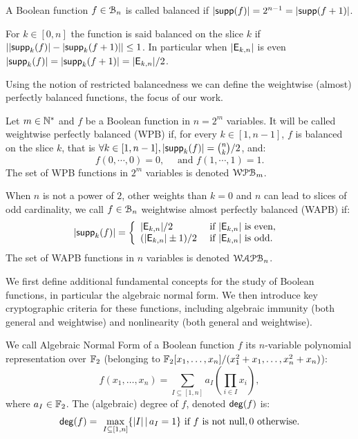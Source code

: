 \documentclass[11pt]{llncs}
\begin{document}
\begin{definition}[Balancedness]\label{def:balancedness}
	A Boolean function $f\in \mathcal{B}_n$ is called balanced if $|\mathsf{supp}(f)|=2^{n-1}=|\mathsf{supp}(f+1)|$. 
	
	For $k\in [0,n]$ the function is said balanced on the slice $k$ if $||\mathsf{supp}_{k}(f)|-|\mathsf{supp}_{k}(f+1)| |\le 1$. In particular when $|\mathsf{E}_{k,n}|$ is even $|\mathsf{supp}_{k}(f)|=|\mathsf{supp}_{k}(f+1)|=|\mathsf{E}_{k,n}|/2$.
\end{definition}

Using the notion of restricted balancedness we can define the weightwise (almost) perfectly balanced functions, the focus of our work.

\begin{definition}\label{def:WAPB}
	Let $m\in \mathbb{N}^*$ and $f$ be a Boolean function in $n=2^m$ variables. It will be called weightwise perfectly balanced (WPB) if, for every $k\in[1,n-1]$, $f$ is balanced on the slice $k$, that is $\forall k \in [1,n-1], |\mathsf{supp}_{k}(f)|=\binom{n}{k}/2$, and:
	\[f(0,\cdots,0)=0,\quad \text{ and } f(1,\cdots,1)=1.\]	
	The set of WPB functions in $2^m$ variables is denoted $\mathcal{WPB}_{m}$.
	
	When $n$ is not a power of $2$, other weights than $k=0$ and $n$ can lead to slices of odd cardinality, we call $f\in \mathcal{B}_{n}$ weightwise almost perfectly balanced (WAPB) if: 
	\[|\mathsf{supp}_{k}(f)|= \left \{
	\begin{array}{l l}
	|\mathsf{E}_{k,n}|/2  & \text{ if } |\mathsf{E}_{k,n}| \text{ is even, } \\
	(|\mathsf{E}_{k,n}|\pm 1)/2  & \text{ if }  |\mathsf{E}_{k,n}| \text{ is odd.}
	\end{array}\right.\]
	The set of WAPB functions in $n$ variables is denoted $\mathcal{WAPB}_{n}$.		
\end{definition}

We first define additional fundamental concepts for the study of Boolean functions, in particular the algebraic normal form. We then introduce key cryptographic criteria for these functions, including algebraic immunity (both general and weightwise) and nonlinearity (both general and weightwise).

\begin{definition}\label{def:anf}
We call Algebraic Normal Form of a Boolean function $f$ its $n$-variable polynomial representation over $\mathbb{F}_2$ (\ie belonging to $\mathbb{F}_2[x_1,\dots,x_n]/(x_1^2+x_1,\dots,x_n^2+x_n)$):
	\[f(x_1,\dots,x_n)= \sum_{I \subseteq [1,n]} a_I \left( \prod_{i \in I} x_i \right), \]
	where $a_I\in \mathbb{F}_2$. 
The (algebraic) degree of $f$, denoted $\mathsf{deg}(f)$ is: \[\mathsf{deg}(f)=\
\max_{I\subseteq [1,n]}\{ |I|\, | \, a_I=1\}  \text{ if $f$ is not null},0  \text{ otherwise}.\]
\end{definition}	
\end{document}
